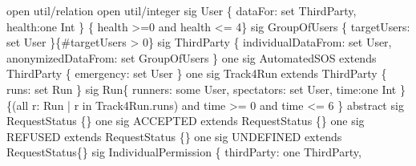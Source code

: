 \documentclass[a4paper]{article}
\begin{document}
{\selectfont \textwidth
open util/relation 
\newline open util/integer
\newline 
\newline sig User \{
\newline dataFor: set ThirdParty,
\newline health:one Int
\newline \} \{ health >=0 and health <= 4\}
\newline 
\newline sig GroupOfUsers \{
\newline targetUsers: set User
\newline \}\{\#targetUsers > 0\}
\newline 
\newline sig ThirdParty \{
\newline individualDataFrom: set User,
\newline anonymizedDataFrom: set GroupOfUsers
\newline \}
\newline 
\newline one sig AutomatedSOS extends ThirdParty \{
\newline 	emergency: set User
\newline \}
\newline 
\newline one sig Track4Run extends ThirdParty \{
\newline runs: set Run 
\newline \}
\newline 
\newline sig Run\{
\newline runners: some User,
\newline spectators: set User,
\newline time:one Int
\newline \}\{(all r: Run | r in Track4Run.runs) and time >= 0 and time <= 6 \}
\newline 
\newline 
\newline abstract sig RequestStatus \{\}
\newline one sig ACCEPTED extends RequestStatus \{\}
\newline one sig REFUSED extends RequestStatus \{\}
\newline one sig UNDEFINED extends RequestStatus\{\}
\newline 
\newline sig IndividualPermission \{
\newline thirdParty: one ThirdParty,
}
\end{document}
